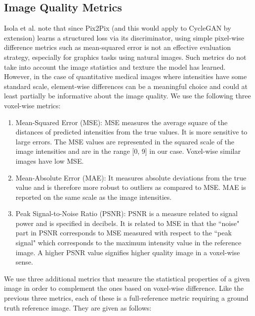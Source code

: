 \subsection{Image Quality Metrics}
\label{image_quality_metrics}
Isola et al. \cite{isola2017image} note that since Pix2Pix (and this would apply to CycleGAN by extension) learns a structured loss via its discriminator, using simple pixel-wise difference metrics such as mean-squared error is not an effective evaluation strategy, especially for graphics tasks using natural images. Such metrics do not take into account the image statistics and texture the model has learned. However, in the case of quantitative medical images where intensities have some standard scale, element-wise differences can be a meaningful choice and could at least partially be informative about the image quality. We use the following three voxel-wise metrics:

\begin{enumerate}
    \item Mean-Squared Error (MSE): MSE measures the average square of the distances of predicted intensities from the true values. It is more sensitive to large errors. The MSE values are represented in the squared scale of the image intensities and are in the range [0, 9] in our case. Voxel-wise similar images have low MSE.
    \item Mean-Absolute Error (MAE): It measures absolute deviations from the true value and is therefore more robust to outliers as compared to MSE. MAE is reported on the same scale as the image intensities.
    \item Peak Signal-to-Noise Ratio (PSNR): PSNR is a measure related to signal power and is specified in decibels. It is related to MSE in that the ``noise" part in PSNR corresponds to MSE measured with respect to the ``peak signal" which corresponds to the maximum intensity value in the reference image. A higher PSNR value signifies higher quality image in a voxel-wise sense.
\end{enumerate}

We use three additional metrics that measure the statistical properties of a given image in order to complement the ones based on voxel-wise difference. Like the previous three metrics, each of these is a full-reference metric requiring a ground truth reference image. They are given as follows:

